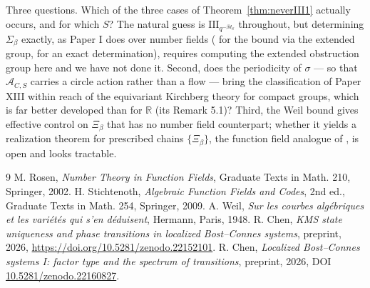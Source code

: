 \documentclass[11pt]{amsart}
\numberwithin{equation}{section}
\theoremstyle{definition}
\theoremstyle{remark}
\newcommand{\R}{\mathbb{R}}
\newcommand{\cA}{\mathcal{A}}
\begin{document}
Three questions. Which of the three cases of Theorem~\ref{thm:neverIII1} actually occurs, and
for which $S$? The natural guess is $\mathrm{III}_{q^{-\beta d_S}}$ throughout, but
determining $\Sigma_\beta$ exactly, as Paper I does over number fields
(\cite[Prop.~2.2]{SeriesI} for the bound via the extended group, \cite[Thm.~4.2]{SeriesI}
for an exact determination), requires computing the extended obstruction group here and we
have not done it. Second, does the periodicity of $\sigma$ --- so that $\cA_{C,S}$ carries a
circle action rather than a flow --- bring the classification of Paper XIII within reach of
the equivariant Kirchberg theory for compact groups, which is far better developed than for
$\R$ (its Remark 5.1)? Third, the Weil bound gives effective control on
$\Xi_\beta$ that has no number field counterpart; whether it yields a realization theorem for
prescribed chains $\{\Xi_\beta\}$, the function field analogue of
\cite[Thm.~5.1]{SeriesI}, is open and looks tractable.

\begin{thebibliography}{9}
 M. Rosen, \emph{Number Theory in Function Fields}, Graduate Texts in Math. 210, Springer, 2002.
 H. Stichtenoth, \emph{Algebraic Function Fields and Codes}, 2nd ed., Graduate Texts in Math. 254, Springer, 2009.
 A. Weil, \emph{Sur les courbes alg\'ebriques et les vari\'et\'es qui s'en d\'eduisent}, Hermann, Paris, 1948.
 R. Chen, \emph{KMS state uniqueness and phase transitions in localized Bost--Connes systems}, preprint, 2026, \newline\url{https://doi.org/10.5281/zenodo.22152101}.
 R. Chen, \emph{Localized Bost--Connes systems I: factor type and the spectrum of transitions}, preprint, 2026, DOI \href{https://doi.org/10.5281/zenodo.22160827}{10.5281/zenodo.22160827}.
\end{thebibliography}
\end{document}
